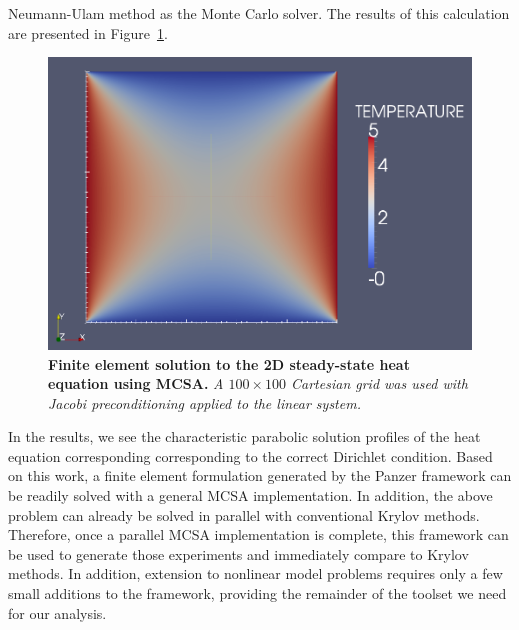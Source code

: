 Neumann-Ulam method as the Monte Carlo solver. The results of this
calculation are presented in Figure~\ref{fig:heat_eq_solution}.
\begin{figure}[htpb!]
  \centering
  \includegraphics[width=5in,clip]{chapters/research_proposal/heat_eq_solution.png}
  \caption{\textbf{Finite element solution to the 2D steady-state heat
      equation using MCSA.} \textit{A $100 \times 100$ Cartesian grid
      was used with Jacobi preconditioning applied to the linear
      system.}}
  \label{fig:heat_eq_solution}
\end{figure}
In the results, we see the characteristic parabolic solution profiles
of the heat equation corresponding corresponding to the correct
Dirichlet condition. Based on this work, a finite element formulation
generated by the Panzer framework can be readily solved with a general
MCSA implementation. In addition, the above problem can already be
solved in parallel with conventional Krylov methods. Therefore, once a
parallel MCSA implementation is complete, this framework can be used
to generate those experiments and immediately compare to Krylov
methods. In addition, extension to nonlinear model problems requires
only a few small additions to the framework, providing the remainder
of the toolset we need for our analysis.

